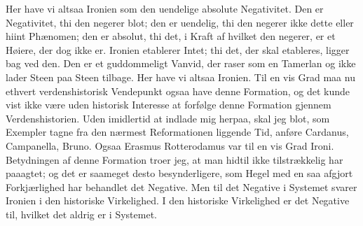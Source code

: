 \documentclass[12pt,a4paper]{article}
\begin{document}
Her have vi altsaa Ironien som den uendelige absolute Negativitet. Den er Negativitet, thi den negerer blot; den er uendelig, thi den negerer ikke dette eller hiint Phænomen; den er absolut, thi det, i Kraft af hvilket den negerer, er et Høiere, der dog ikke er. Ironien etablerer Intet; thi det, der skal etableres, ligger bag ved den. Den er et guddommeligt Vanvid, der raser som en Tamerlan og ikke lader Steen paa Steen tilbage. Her have vi altsaa Ironien. Til en vis Grad maa nu ethvert verdenshistorisk Vendepunkt ogsaa have denne Formation, og det kunde vist ikke være uden historisk Interesse at forfølge denne Formation gjennem Verdenshistorien. Uden imidlertid at indlade mig herpaa, skal jeg blot, som Exempler tagne fra den nærmest Reformationen liggende Tid, anføre Cardanus, Campanella, Bruno. Ogsaa Erasmus Rotterodamus var til en vis Grad Ironi. Betydningen af denne Formation troer jeg, at man hidtil ikke tilstrækkelig har paaagtet; og det er saameget desto besynderligere, som Hegel med en saa afgjort Forkjærlighed har behandlet det Negative. Men til det Negative i Systemet svarer Ironien i den historiske Virkelighed. I den historiske Virkelighed er det Negative til, hvilket det aldrig er i Systemet.
\end{document}
